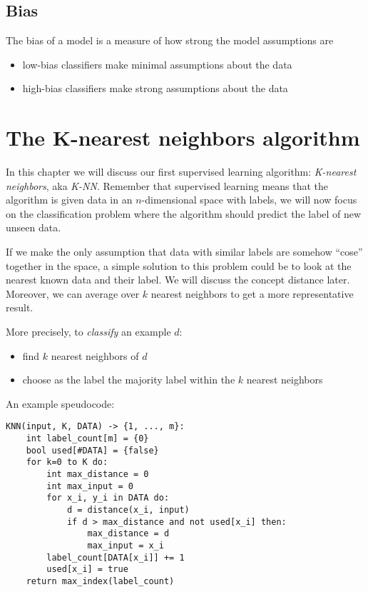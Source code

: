 \documentclass[11pt]{article}
\begin{document}
\subsection{Bias}\label{bias}

The bias of a model is a measure of how strong the model assumptions are

\begin{itemize}
\tightlist
\item
  low-bias classifiers make minimal assumptions about the data
\item
  high-bias classifiers make strong assumptions about the data
\end{itemize}

\section{The K-nearest neighbors
algorithm}\label{the-k-nearest-neighbors-algorithm}

In this chapter we will discuss our first supervised learning algorithm:
\emph{K-nearest neighbors}, aka \emph{K-NN}. Remember that supervised
learning means that the algorithm is given data in an \(n\)-dimensional
space with labels, we will now focus on the classification problem where
the algorithm should predict the label of new unseen data.

If we make the only assumption that data with similar labels are somehow
``cose'' together in the space, a simple solution to this problem could
be to look at the nearest known data and their label. We will discuss
the concept distance later. Moreover, we can average over \(k\) nearest
neighbors to get a more representative result.

More precisely, to \emph{classify} an example \(d\):

\begin{itemize}
\tightlist
\item
  find \(k\) nearest neighbors of \(d\)
\item
  choose as the label the majority label within the \(k\) nearest
  neighbors
\end{itemize}

An example speudocode:

\begin{verbatim}
KNN(input, K, DATA) -> {1, ..., m}:
    int label_count[m] = {0}
    bool used[#DATA] = {false}
    for k=0 to K do:
        int max_distance = 0
        int max_input = 0
        for x_i, y_i in DATA do:
            d = distance(x_i, input)
            if d > max_distance and not used[x_i] then:
                max_distance = d
                max_input = x_i
        label_count[DATA[x_i]] += 1
        used[x_i] = true
    return max_index(label_count)
\end{verbatim}
\end{document}
